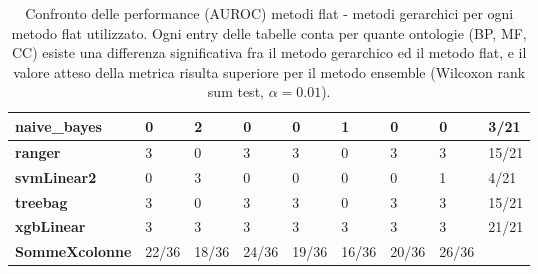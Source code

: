 \documentclass[12pt]{report}
\begin{document}
\begin{appendices}
\begin{table}[h!]
{\begin{tabular}{|l|l|l|l|l|l|l|l|l|}
\textbf{naive\_bayes}  & 0             & 2            & 0               & 0                   & 1               & 0                   & 0              & 3/21                 \\ \hline
\textbf{ranger}        & 3             & 0            & 3               & 3                   & 0               & 3                   & 3              & 15/21                \\ \hline
\textbf{svmLinear2}    & 0             & 3            & 0               & 0                   & 0               & 0                   & 1              & 4/21                 \\ \hline
\textbf{treebag}       & 3             & 0            & 3               & 3                   & 0               & 3                   & 3              & 15/21                \\ \hline
\textbf{xgbLinear}     & 3             & 3            & 3               & 3                   & 3               & 3                   & 3              & 21/21                \\ \hline
\textbf{SommeXcolonne} & 22/36         & 18/36        & 24/36           & 19/36               & 16/36           & 20/36               & 26/36          &                      \\ \hline
\end{tabular}}
\caption{\footnotesize{Confronto delle performance (AUROC) metodi flat - metodi gerarchici per ogni metodo flat utilizzato. Ogni entry delle tabelle conta per quante ontologie (BP, MF, CC) esiste una differenza significativa fra il metodo gerarchico ed il metodo flat, e il valore atteso della metrica risulta superiore per il metodo ensemble (Wilcoxon rank sum test, $\alpha = 0.01$).}}
\label{AUROC_1_}
\end{table}


\end{appendices}
\end{document}
